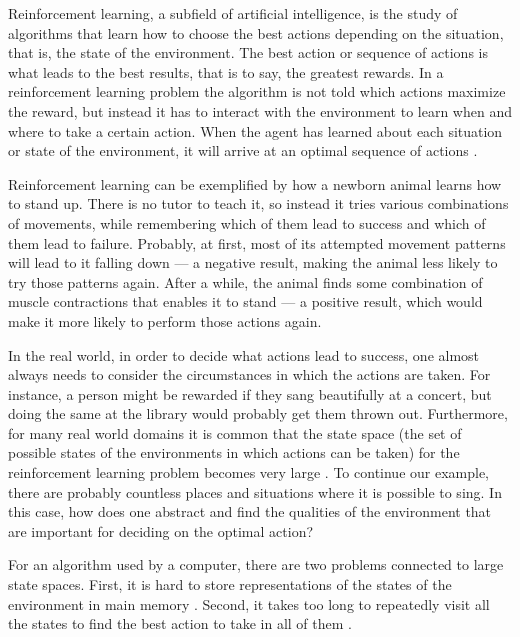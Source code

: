 Reinforcement learning, a subfield of artificial intelligence, is the study of algorithms that learn how to choose the best actions depending on the situation, that is, the state of the environment. The best action or sequence of actions is what leads to the best results, that is to say, the greatest rewards. In a reinforcement learning problem the algorithm is not told which actions maximize the reward, but instead it has to interact with the environment to learn when and where to take a certain action. When the agent has learned about each situation or state of the environment, it will arrive at an optimal sequence of actions \parencite{barto1998reinforcement}.




Reinforcement learning can be exemplified by how a newborn animal learns how to stand up. There is no tutor to teach it, so instead it tries various combinations of movements, while remembering which of them lead to success and which of them lead to failure. Probably, at first, most of its attempted movement patterns will lead to it falling down --- a negative result, making the animal less likely to try those patterns again. After a while, the animal finds some combination of muscle contractions that enables it to stand --- a positive result, which would make it more likely to perform those actions again. 

In the real world, in order to decide what actions lead to success, one almost always needs to consider the circumstances in which the actions are taken. For instance, a person might be rewarded if they sang beautifully at a concert, but doing the same at the library would probably get them thrown out. Furthermore, for many real world domains it is common that the state space (the set of possible states of the environments in which actions can be taken) for the reinforcement learning problem becomes very large \parencite{guestrin2003efficient}. To continue our example, there are probably countless places and situations where it is possible to sing. In this case, how does one abstract and find the qualities of the environment that are important for deciding on the optimal action? 

For an algorithm used by a computer, there are two problems connected to large state spaces. First, it is hard to store representations of the states of the environment in main memory \parencite{szepesvari2010algorithms}. Second, it takes too long to repeatedly visit all the states to find the best action to take in all of them \parencite{dietterich2013pac}.